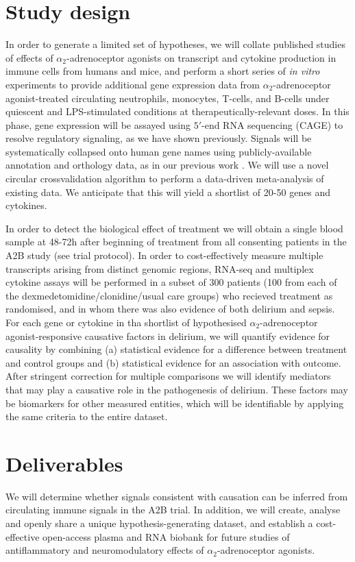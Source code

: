 \documentclass[a4paper,11pt,onecolumn]{IEEEtran}
\newcommand{\ataa}{$\alpha_2$-adrenoceptor agonist\xspace}
\newcommand{\ataas}{$\alpha_2$-adrenoceptor agonists\xspace}
\begin{document}
\section*{Study design}
In order to generate a limited set of hypotheses, we will collate published studies of effects of \ataas on transcript and cytokine production in immune cells from humans and mice, and perform a short series of \emph{in vitro} experiments to provide additional gene expression data from \ataa-treated circulating neutrophils, monocytes, T-cells, and B-cells under quiescent and LPS-stimulated conditions at therapeutically-relevant doses. In this phase, gene expression will be assayed using $5'$-end RNA sequencing (CAGE) to resolve regulatory signaling, as we have shown previously\cite{fantom5biblatex}. Signals will be systematically collapsed onto human gene names using publicly-available annotation and orthology data, as in our previous work \cite{schroder_conservation_2012}. We will use a novel circular crossvalidation algorithm to perform a data-driven meta-analysis of existing data. We anticipate that this will yield a shortlist of 20-50 genes and cytokines.\par
In order to detect the biological effect of treatment we will obtain a single blood sample at 48-72h after beginning of treatment from all consenting patients in the A2B study (see trial protocol). In order to cost-effectively measure multiple transcripts arising from distinct genomic regions, RNA-seq and multiplex cytokine assays will be performed in a subset of 300 patients (100 from each of the dexmedetomidine/clonidine/usual care groups) who recieved treatment as randomised, and in whom there was also evidence of both delirium and sepsis. For each gene or cytokine in tha shortlist of hypothesised \ataa-responsive causative factors in delirium, we will quantify evidence for causality by combining (a) statistical evidence for a difference between treatment and control groups and (b) statistical evidence for an association with outcome. After stringent correction for multiple comparisons we will identify mediators that may play a causative role in the pathogenesis of delirium. These factors may be biomarkers for other measured entities, which will be identifiable by applying the same criteria to the entire dataset. 
\par

\section*{Deliverables}
We will determine whether signals consistent with causation can be inferred from circulating immune signals in the A2B trial. In addition, we will create, analyse and openly share a unique hypothesis-generating dataset, and establish a cost-effective open-access plasma and RNA biobank for future studies of antiflammatory and neuromodulatory effects of \ataas. \par

\printbibliography
\end{document}
